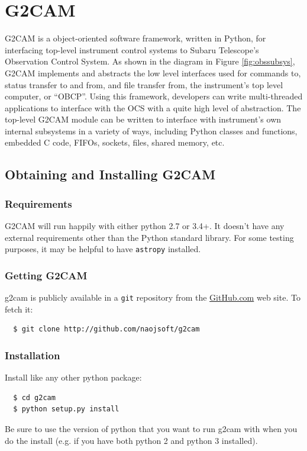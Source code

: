 \documentclass[11pt]{report}
\begin{document}
\chapter{G2CAM}
G2CAM is a object-oriented software framework, written in Python, for
interfacing top-level instrument control systems to Subaru Telescope's
Observation Control System. As shown in the diagram in Figure
\ref{fig:obssubsys}, G2CAM implements and abstracts the low level
interfaces used for commands to, status transfer to and from, and file
transfer from, the instrument's top level computer, or ``OBCP''. Using
this framework, developers can write multi-threaded applications to
interface with the OCS with a quite high level of abstraction. The
top-level G2CAM module can be written to interface with instrument's
own internal subsystems in a variety of ways, including Python classes
and functions, embedded C code, FIFOs, sockets, files, shared memory,
etc.

\section{Obtaining and Installing G2CAM}

\subsection{Requirements}
G2CAM will run happily with either python 2.7 or 3.4+.  It doesn't have
any external requirements other than the Python standard library.
For some testing purposes, it may be helpful to have {\tt astropy}
installed.  

\subsection{Getting G2CAM}
g2cam is publicly available in a {\tt git} repository from the
\url{GitHub.com} web site.  To fetch it:
\begin{verbatim}
  $ git clone http://github.com/naojsoft/g2cam
\end{verbatim}

\subsection{Installation}
Install like any other python package:
\begin{verbatim}
  $ cd g2cam
  $ python setup.py install
\end{verbatim}
Be sure to use the version of python that you want to run g2cam with
when you do the install (e.g. if you have both python 2 and python 3
installed).
\end{document}
